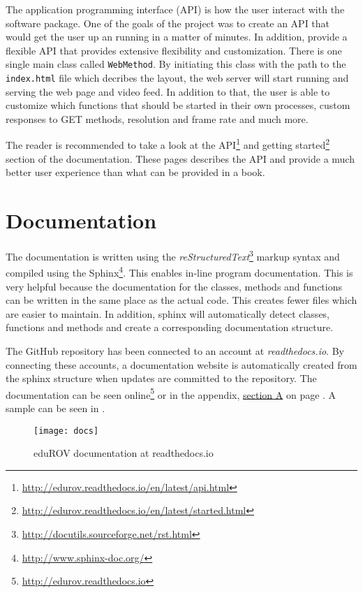 The application programming interface (API) is how the user interact with the software package. One of the goals of the project was to create an API that would get the user up an running in a matter of minutes. In addition, provide a flexible API that provides extensive flexibility and customization. There is one single main class called \texttt{WebMethod}. By initiating this class with the path to the \texttt{index.html} file which decribes the layout, the web server will start running and serving the web page and video feed. In addition to that, the user is able to customize which functions that should be started in their own processes, custom responses to GET methods, resolution and frame rate and much more.

The reader is recommended to take a look at the API\footnote{\url{http://edurov.readthedocs.io/en/latest/api.html}} and getting started\footnote{\url{http://edurov.readthedocs.io/en/latest/started.html}} section of the documentation. These pages describes the API and provide a much better user experience than what can be provided in a book. 


\section{Documentation}


The documentation is written using the \emph{reStructuredText}\footnote{\url{http://docutils.sourceforge.net/rst.html}} markup syntax and compiled using the Sphinx\footnote{\url{http://www.sphinx-doc.org/}}. This enables in-line program documentation. This is very helpful because the documentation for the classes, methods and functions can be written in the same place as the actual code. This creates fewer files which are easier to maintain. In addition, sphinx will automatically detect classes, functions and methods and create a corresponding documentation structure.

The GitHub repository has been connected to an account at \emph{readthedocs.io}. By connecting these accounts, a documentation website is automatically created from the sphinx structure when updates are committed to the repository. The documentation can be seen online\footnote{\url{http://edurov.readthedocs.io}} or in the appendix, \hyperref[appDoc]{section A} on page \pageref{appDoc}. A sample can be seen in .

\begin{figure}[h!]
    \centering
    \texttt{[image: docs]}
    \caption{eduROV documentation at readthedocs.io}
    \label{docs}
\end{figure}
\clearpage
